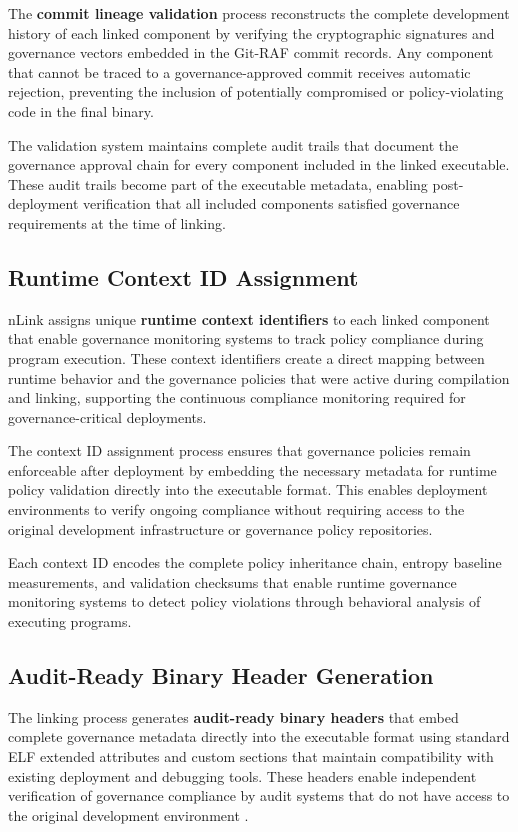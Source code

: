 The \textbf{commit lineage validation} process reconstructs the complete development history of each linked component by verifying the cryptographic signatures and governance vectors embedded in the Git-RAF commit records. Any component that cannot be traced to a governance-approved commit receives automatic rejection, preventing the inclusion of potentially compromised or policy-violating code in the final binary.

The validation system maintains complete audit trails that document the governance approval chain for every component included in the linked executable. These audit trails become part of the executable metadata, enabling post-deployment verification that all included components satisfied governance requirements at the time of linking.

\subsection{Runtime Context ID Assignment}

nLink assigns unique \textbf{runtime context identifiers} to each linked component that enable governance monitoring systems to track policy compliance during program execution. These context identifiers create a direct mapping between runtime behavior and the governance policies that were active during compilation and linking, supporting the continuous compliance monitoring required for governance-critical deployments.

The context ID assignment process ensures that governance policies remain enforceable after deployment by embedding the necessary metadata for runtime policy validation directly into the executable format. This enables deployment environments to verify ongoing compliance without requiring access to the original development infrastructure or governance policy repositories.

Each context ID encodes the complete policy inheritance chain, entropy baseline measurements, and validation checksums that enable runtime governance monitoring systems to detect policy violations through behavioral analysis of executing programs.

\subsection{Audit-Ready Binary Header Generation}

The linking process generates \textbf{audit-ready binary headers} that embed complete governance metadata directly into the executable format using standard ELF extended attributes and custom sections that maintain compatibility with existing deployment and debugging tools. These headers enable independent verification of governance compliance by audit systems that do not have access to the original development environment \cite{TODO:audit-binary-headers-spec}.

